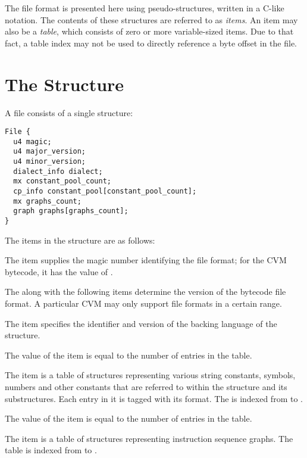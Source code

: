 The  file format is presented here using pseudo-structures, written in a C-like notation. The contents of these structures are referred to as {\em items}. An item may also be a {\em table}, which consists of zero or more variable-sized items. Due to that fact, a table index may not be used to directly reference a byte offset in the file. 






\section{The  Structure}

A  file consists of a single  structure: 

\begin{lstlisting}
File {
  u4 magic;
  u4 major_version;
  u4 minor_version;
  dialect_info dialect;
  mx constant_pool_count;
  cp_info constant_pool[constant_pool_count];
  mx graphs_count;
  graph graphs[graphs_count];
}
\end{lstlisting}

The items in the  structure are as follows: 

\begin{description}[font=\ttfamily\mdseries,style=nextline]
  \item[magic]
  The  item supplies the magic number identifying the  file format; for the CVM bytecode, it has the value of . 
  \item[major\_version, minor\_version]
  The  along with the following  items determine the version of the bytecode file format. A particular CVM may only support file formats in a certain range. 
  \item[dialect]
  The  item specifies the identifier and version of the backing language of the  structure. 
  \item[constant\_pool\_count]
  The value of the  item is equal to the number of entries in the  table. 
  \item[constant\_pool]
  The  item is a table of structures representing various string constants, symbols, numbers and other constants that are referred to within the  structure and its substructures. Each entry in it is tagged with its format. The  is indexed from  to . 
  \item[graphs\_count]
  The value of the  item is equal to the number of entries in the  table. 
  \item[graphs]
  The  item is a table of structures representing instruction sequence graphs. The  table is indexed from  to . 
\end{description}





